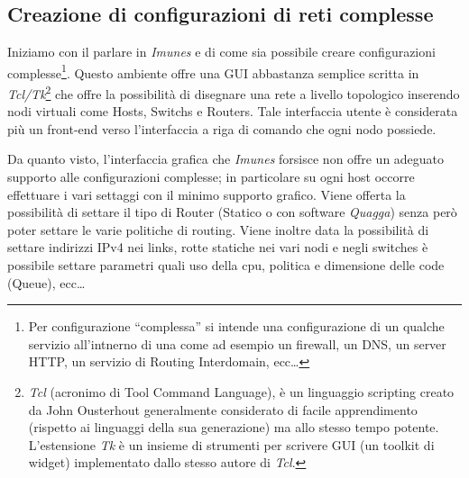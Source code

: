 \subsection{Creazione di configurazioni di reti complesse}
Iniziamo con il parlare in \emph{Imunes} e di come sia possibile creare configurazioni complesse\footnote{Per configurazione ``complessa'' si intende una configurazione di un qualche servizio all'intnerno di una \virtualmachine come ad esempio un firewall, un DNS, un server HTTP, un servizio di Routing Interdomain, ecc\ldots}.
Questo ambiente offre una GUI abbastanza semplice scritta in \emph{Tcl/Tk}\footnote{\emph{Tcl} (acronimo di Tool Command Language), è un linguaggio scripting creato da John Ousterhout generalmente considerato di facile apprendimento (rispetto ai linguaggi della sua generazione) ma allo stesso tempo potente. L'estensione \emph{Tk} è un insieme di strumenti per scrivere GUI (un toolkit di widget) implementato dallo stesso autore di \emph{Tcl}.} che offre la possibilità di disegnare una rete a livello topologico inserendo nodi virtuali come Hosts, Switchs e Routers. Tale interfaccia utente è considerata più un front-end verso l'interfaccia a riga di comando che ogni nodo possiede.

Da quanto visto\cite{IMUNESHOWTO}, l'interfaccia grafica che \emph{Imunes} forsisce non offre un adeguato supporto alle configurazioni complesse; in particolare su ogni host occorre effettuare i vari settaggi con il minimo supporto grafico. Viene offerta la possibilità di settare il tipo di Router (Statico o con software \emph{Quagga}) senza però poter settare le varie politiche di routing. Viene inoltre data la possibilità di settare indirizzi IPv4 nei links, rotte statiche nei vari nodi e negli switches è possibile settare parametri quali uso della cpu, politica e dimensione delle code (Queue), ecc\ldots

